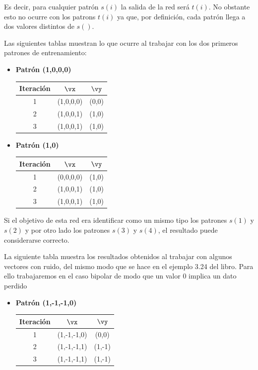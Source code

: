 \begin{problem}[11]
Es decir, para cualquier patrón $s(i)$ la salida de la red será $t(i)$. No obstante esto no ocurre con los patrons $t(i)$ ya que, por definición, cada patrón llega a dos valores distintos de $s()$.

Las siguientes tablas muestran lo que ocurre al trabajar con los dos primeros patrones de entrenamiento:

\begin{multicols}{2}
\begin{itemize}
\item \textbf{Patrón (1,0,0,0)}

\begin{tabular}{|ccc|}
\hline
\textbf{Iteración} & $\vx$ & $\vy$ \\
\hline
1 & (1,0,0,0) & (0,0) \\
\hline
2 & (1,0,0,1) & (1,0) \\
\hline
3 & (1,0,0,1) & (1,0) \\
\hline
\end{tabular}
\item \textbf{Patrón (1,0)}

\begin{tabular}{|ccc|}
\hline
\textbf{Iteración} & $\vx$ & $\vy$ \\
\hline
1 & (0,0,0,0) & (1,0) \\
\hline
2 & (1,0,0,1) & (1,0) \\
\hline
3 & (1,0,0,1) & (1,0) \\
\hline
\end{tabular}
\end{itemize}
\end{multicols}

Si el objetivo de esta red era identificar como un mismo tipo los patrones $s(1)$ y $s(2)$ y por otro lado los patrones $s(3)$ y $s(4)$, el resultado puede considerarse correcto.

\spart

La siguiente tabla muestra los resultados obtenidos al trabajar con algunos vectores con ruido, del mismo modo que se hace en el ejemplo 3.24 del libro. Para ello trabajaremos en el caso bipolar de modo que un valor 0 implica un dato perdido

\begin{multicols}{2}
\begin{itemize}
\item \textbf{Patrón (1,-1,-1,0)}

\begin{tabular}{|ccc|}
\hline
\textbf{Iteración} & $\vx$ & $\vy$ \\
\hline
1 & (1,-1,-1,0) & (0,0) \\
\hline
2 & (1,-1,-1,1) & (1,-1) \\
\hline
3 & (1,-1,-1,1) & (1,-1) \\
\hline
\end{tabular}


\end{itemize}
\end{multicols}
\end{problem}
